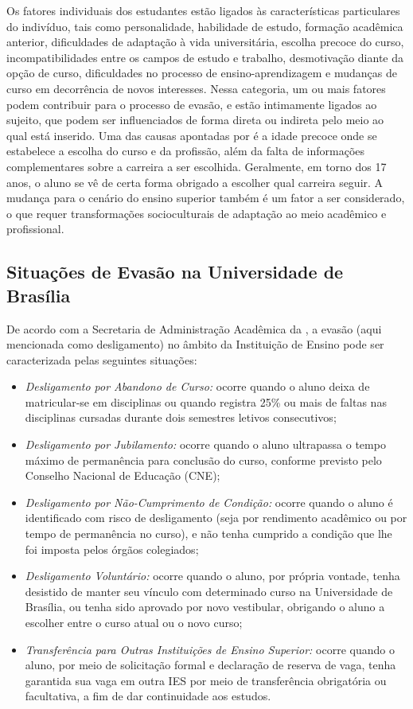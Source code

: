 Os fatores individuais dos estudantes estão ligados às características particulares do indivíduo, tais como personalidade, habilidade de estudo, formação acadêmica anterior, dificuldades de adaptação à vida universitária, escolha precoce do curso, incompatibilidades entre os campos de estudo e trabalho, desmotivação diante da opção de curso, dificuldades no processo de ensino-aprendizagem e mudanças de curso em decorrência de novos interesses. Nessa categoria, um ou mais fatores podem contribuir para o processo de evasão, e estão intimamente ligados ao sujeito, que podem ser influenciados de forma direta ou indireta pelo meio ao qual está inserido. Uma das causas apontadas por \citet{mec_1997} é a idade precoce onde se estabelece a escolha do curso e da profissão, além da falta de informações complementares sobre a carreira a ser escolhida. Geralmente, em torno dos 17 anos, o aluno se vê de certa forma obrigado a escolher qual carreira seguir. A mudança para o cenário do ensino superior também é um fator a ser considerado, o que requer transformações socioculturais de adaptação ao meio acadêmico e profissional. 

\subsection{Situações de Evasão na Universidade de Brasília} \label{2title31}

De acordo com a Secretaria de Administração Acadêmica da \citet{unb_saa}, a evasão (aqui mencionada como desligamento) no âmbito da Instituição de Ensino pode ser caracterizada pelas seguintes situações:
\begin{itemize}
	\item \textit{Desligamento por Abandono de Curso:} ocorre quando o aluno deixa de matricular-se em disciplinas ou quando registra 25\% ou mais de faltas nas disciplinas cursadas durante dois semestres letivos consecutivos;  
	\item \textit{Desligamento por Jubilamento:} ocorre quando o aluno ultrapassa o tempo máximo de permanência para conclusão do curso, conforme previsto pelo Conselho Nacional de Educação (CNE);
	\item \textit{Desligamento por Não-Cumprimento de Condição:} ocorre quando o aluno é identificado com risco de desligamento (seja por rendimento acadêmico ou por tempo de permanência no curso), e não tenha cumprido a condição que lhe foi imposta pelos órgãos colegiados;
	\item \textit{Desligamento Voluntário:} ocorre quando o aluno, por própria vontade, tenha desistido de manter seu vínculo com determinado curso na Universidade de Brasília, ou tenha sido aprovado por novo vestibular, obrigando o aluno a escolher entre o curso atual ou o novo curso; 
	\item \textit{Transferência para Outras Instituições de Ensino Superior:} ocorre quando o aluno, por meio de solicitação formal e declaração de reserva de vaga, tenha garantida sua vaga em outra IES por meio de transferência obrigatória ou facultativa, a fim de dar continuidade aos estudos.
	
\end{itemize}

